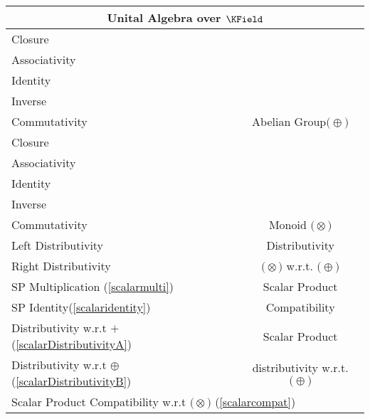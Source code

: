\documentclass[a4paper,12pt]{scrartcl}    %
\newcommand{\OpA}{\otimes}
\newcommand{\OpB}{\oplus}
\begin{document}
\begin{minipage}[c]{0,5\textwidth}
\vspace{0.6cm}
\begin{tabular}{|l|c|} %
  \hline
  \multicolumn{2}{c}{\cellcolor{green!25}Unital Algebra over $\KField$} \\
  \hline
    \cellcolor{blue!25} \footnotesize Closure& \cellcolor{yellow!25}  \\
    \cellcolor{blue!25} \footnotesize Associativity& \cellcolor{yellow!25}  \\
    \cellcolor{blue!25} \footnotesize Identity& \cellcolor{yellow!25} \\
    \cellcolor{blue!25} \footnotesize Inverse& \cellcolor{yellow!25} \\
    \cellcolor{blue!25} \footnotesize Commutativity& \multirow{-5}{*}{\tiny\cellcolor{yellow!25}Abelian Group$\big(\OpB\big)$} \\
   \hline
    \cellcolor{blue!25} \footnotesize Closure& \cellcolor{yellow!25}  \\
    \cellcolor{blue!25} \footnotesize Associativity& \cellcolor{yellow!25}  \\
    \cellcolor{blue!25} \footnotesize Identity& \cellcolor{yellow!25} \\
    \cellcolor{red!25} \footnotesize Inverse& \cellcolor{yellow!25} \\
    \cellcolor{red!25} \footnotesize Commutativity& \multirow{-5}{*}{\tiny\cellcolor{yellow!25} Monoid $\big(\OpA\big)$} \\
  \hline
  	\cellcolor{blue!25} \footnotesize Left Distributivity&  \tiny\cellcolor{yellow!25}Distributivity\\
    \cellcolor{blue!25} \footnotesize Right Distributivity & \tiny\cellcolor{yellow!25} $\big(\OpA\big)$ w.r.t. $\big(\OpB\big)$  \\
   \hline
  \hline
     \cellcolor{blue!25} \footnotesize SP Multiplication (\ref{scalarmulti})&  \tiny\cellcolor{yellow!25}Scalar Product\\
    \cellcolor{blue!25} \footnotesize SP Identity(\ref{scalaridentity}) & \tiny\cellcolor{yellow!25} Compatibility  \\
   \hline 
    \cellcolor{blue!25} \footnotesize Distributivity w.r.t $+$ (\ref{scalarDistributivityA})&  \tiny\cellcolor{yellow!25}Scalar Product\\
    \cellcolor{blue!25} \footnotesize Distributivity w.r.t $\OpB$ (\ref{scalarDistributivityB}) & \tiny\cellcolor{yellow!25} distributivity w.r.t. $\big(\OpB\big)$  \\
   \hline
    \multicolumn{2}{l}{\footnotesize \cellcolor{blue!25} Scalar Product Compatibility w.r.t  $\big(\OpA\big)$ (\ref{scalarcompat})}\\
   \hline
\end{tabular}

\end{minipage}
\end{document}
